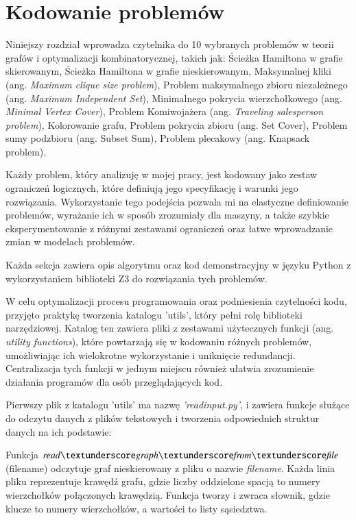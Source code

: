 \chapter{Kodowanie problemów}

Niniejszy rozdział wprowadza czytelnika do 10 wybranych problemów w teorii grafów i optymalizacji kombinatorycznej, takich jak:
Ścieżka Hamiltona w grafie skierowanym,
Ścieżka Hamiltona w grafie nieskierowanym, 
Maksymalnej kliki (ang. \textit{Maximum clique size problem}), 
Problem maksymalnego zbioru niezależnego (ang. \textit{Maximum Independent Set}),
Minimalnego pokrycia wierzchołkowego (ang. \textit{Minimal Vertex Cover}), 
Problem Komiwojażera (ang. \textit{Traveling salesperson problem}), 
Kolorowanie grafu, 
Problem pokrycia zbioru (ang. Set Cover), 
Problem sumy podzbioru (ang. Subset Sum), 
Problem plecakowy (ang. Knapsack problem).

Każdy problem, który analizuję w mojej pracy, jest kodowany jako zestaw ograniczeń logicznych, które definiują jego specyfikację i warunki jego rozwiązania. Wykorzystanie tego podejścia pozwala mi na elastyczne definiowanie problemów, wyrażanie ich w sposób zrozumiały dla maszyny, a także szybkie eksperymentowanie z różnymi zestawami ograniczeń oraz łatwe wprowadzanie zmian w modelach problemów.

Każda sekcja zawiera opis algorytmu oraz kod demonstracyjny w języku Python z wykorzystaniem biblioteki Z3 do rozwiązania tych problemów.

W celu optymalizacji procesu programowania oraz podniesienia czytelności kodu, przyjęto praktykę tworzenia katalogu 'utils', który pełni rolę biblioteki narzędziowej. Katalog ten zawiera pliki z zestawami użytecznych funkcji (ang. \textit{utility functions}), które powtarzają się w kodowaniu różnych problemów, umożliwiając ich wielokrotne wykorzystanie i uniknięcie redundancji. Centralizacja tych funkcji w jednym miejscu również ułatwia zrozumienie działania programów dla osób przeglądających kod. 

Pierwszy plik z katalogu 'utils' ma nazwę \textit{'read\textunderscore input.py'}, i zawiera funkcje służące do odczytu danych z plików tekstowych i tworzenia odpowiednich struktur danych na ich podstawie:

Funkcja $\readgraph$(filename) odczytuje graf nieskierowany z pliku o nazwie \textit{filename}. Każda linia pliku reprezentuje krawędź grafu, gdzie liczby oddzielone spacją to numery wierzchołków połączonych krawędzią. Funkcja tworzy i zwraca słownik, gdzie klucze to numery wierzchołków, a wartości to listy sąsiedztwa.

